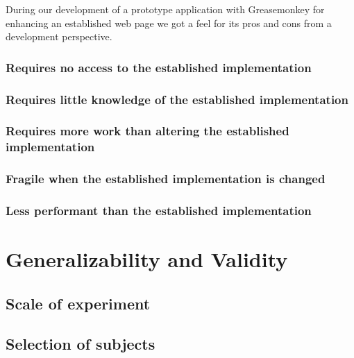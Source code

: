 \parabreak

During our development of a prototype application with Greasemonkey for
enhancing an established web page we got a feel for its pros and cons from a
development perspective.

\subsubsection{Requires no access to the established implementation}

\subsubsection{Requires little knowledge of the established implementation}

\subsubsection{Requires more work than altering the established
  implementation}

\subsubsection{Fragile when the established implementation is changed}

\subsubsection{Less performant than the established implementation}

\section{Generalizability and Validity}

\subsection{Scale of experiment}


\subsection{Selection of subjects}

